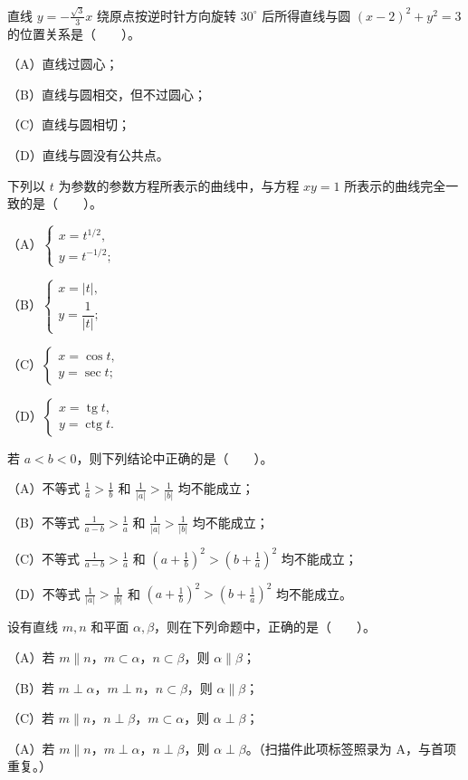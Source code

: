 \begin{question}
直线 $y=-\frac{\sqrt3}{3}x$ 绕原点按逆时针方向旋转 $30^\circ$ 后所得直线与圆 $(x-2)^2+y^2=3$ 的位置关系是\mbox{（　　）}。

（A）直线过圆心；

（B）直线与圆相交，但不过圆心；

（C）直线与圆相切；

（D）直线与圆没有公共点。

\end{question}
\begin{question}
下列以 $t$ 为参数的参数方程所表示的曲线中，与方程 $xy=1$ 所表示的曲线完全一致的是\mbox{（　　）}。

（A）$\begin{cases}x=t^{1/2},\\y=t^{-1/2};\end{cases}$

（B）$\begin{cases}x=|t|,\\y=\dfrac1{|t|};\end{cases}$

（C）$\begin{cases}x=\cos t,\\y=\sec t;\end{cases}$

（D）$\begin{cases}x=\operatorname{tg}t,\\y=\operatorname{ctg}t.\end{cases}$

\end{question}
\begin{question}
若 $a<b<0$，则下列结论中正确的是\mbox{（　　）}。

（A）不等式 $\frac1a>\frac1b$ 和 $\frac1{|a|}>\frac1{|b|}$ 均不能成立；

（B）不等式 $\frac1{a-b}>\frac1a$ 和 $\frac1{|a|}>\frac1{|b|}$ 均不能成立；

（C）不等式 $\frac1{a-b}>\frac1a$ 和 $\left(a+\frac1b\right)^2>\left(b+\frac1a\right)^2$ 均不能成立；

（D）不等式 $\frac1{|a|}>\frac1{|b|}$ 和 $\left(a+\frac1b\right)^2>\left(b+\frac1a\right)^2$ 均不能成立。

\end{question}
\begin{question}
设有直线 $m,n$ 和平面 $\alpha,\beta$，则在下列命题中，正确的是\mbox{（　　）}。

（A）若 $m\parallel n$，$m\subset\alpha$，$n\subset\beta$，则 $\alpha\parallel\beta$；

（B）若 $m\perp\alpha$，$m\perp n$，$n\subset\beta$，则 $\alpha\parallel\beta$；

（C）若 $m\parallel n$，$n\perp\beta$，$m\subset\alpha$，则 $\alpha\perp\beta$；

（A）若 $m\parallel n$，$m\perp\alpha$，$n\perp\beta$，则 $\alpha\perp\beta$。（扫描件此项标签照录为 A，与首项重复。）

\end{question}

